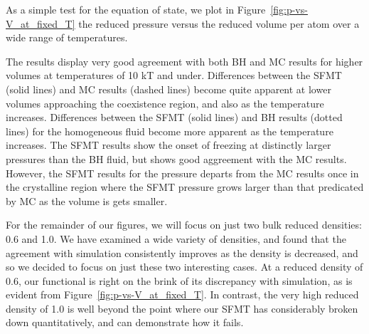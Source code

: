 \documentclass[letterpaper,twocolumn,amsmath,amssymb,prb]{revtex4-1}
\begin{document}
As a simple test for the equation of state, we plot in 
Figure~\ref{fig:p-vs-V_at_fixed_T} the 
reduced pressure versus the reduced volume per atom 
over a wide range of temperatures.
%
%

The results
display very good agreement with both BH and MC results
for higher volumes at temperatures of 10 kT and under. 
Differences between the SFMT (solid lines) and MC results (dashed lines) 
become quite apparent at lower volumes approaching the coexistence region,
and also as the temperature increases. 
Differences between the SFMT (solid lines) and BH results (dotted lines) 
for the homogeneous fluid become more apparent as the temperature increases.
%
%
The SFMT results show the onset of freezing at distinctly larger 
pressures than the BH fluid, but shows good aggreement with the MC results.
However, the SFMT results for the pressure departs from the MC results 
once in the crystalline region where the SFMT pressure grows larger than 
that predicated by MC as the volume is gets smaller.

For the remainder of our figures, we will focus on just two bulk
reduced densities: 0.6 and 1.0.  
We have examined a wide variety of
densities, and found that the agreement with simulation consistently
improves as the density is decreased, and so we decided to focus on
just these two interesting cases.  
At a reduced density of 0.6, our
functional is right on the brink of its discrepancy with simulation,
as is evident from Figure~\ref{fig:p-vs-V_at_fixed_T}.  
In contrast, the very high
reduced density of 1.0 is well beyond the point where our SFMT has
considerably broken down quantitatively, and can demonstrate how it
fails. 
\end{document}
